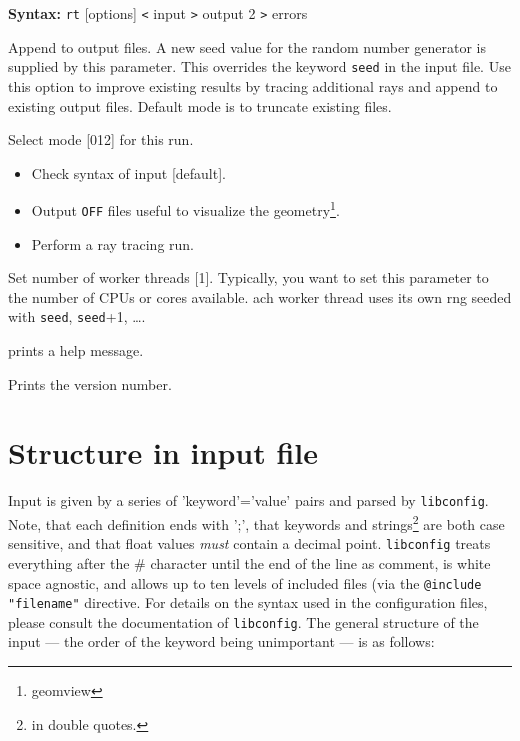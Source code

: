 \documentclass[10pt,a4paper,titlepage]{article}
\newcommand{\rt}{{\tt rt} }
\begin{document}
{\bf Syntax:} \rt [options] {\tt <} input {\tt >} output 2 {\tt >} errors
\vspace{1em}
\begin{list}{}
{\setlength{\leftmargin}{3.5cm}
\setlength{\labelwidth}{3.0cm}
\setlength{\labelsep}{0.25cm}
\setlength{\rightmargin}{0.5cm}}

\item[{\tt [--append|-a]}] Append to output files. A new seed value for the random number generator is supplied by this parameter. This overrides the keyword {\tt seed} in the input file. Use this option to improve existing results by tracing additional rays and append to existing output files. Default mode is to truncate existing files.

\item[{\tt [--mode|-m]}] Select mode [012] for this run.
\begin{itemize}
\item[\tt -m0]{Check syntax of input [default].}
\item[\tt -m1]{Output {\tt OFF} files useful to visualize the geometry\footnote{geomview}.}
\item[\tt -m2]{Perform a ray tracing run.}
\end{itemize}

\item[{\tt [--threads|-t]}] {Set number of worker threads [1]. Typically, you want to set this parameter to the number of CPUs or cores available. ach worker thread uses its own rng seeded with {\tt seed}, {\tt seed}+1}, \ldots{}.

\item[{\tt [--help|-h]}] prints a help message.

\item[{\tt [--Version|-V]}] Prints the version number.

\end{list}


\section{Structure in input file}
Input is given by a series of 'keyword'='value' pairs and parsed by {\tt libconfig}. Note, that each definition ends with ';', that keywords and strings\footnote{in double quotes.} are both case sensitive, and that float values \emph{must} contain a decimal point. {\tt libconfig} treats everything after the \# character until the end of the line as comment, is white space agnostic, and allows up to ten levels of included files (via the {\tt @include "filename"} directive. For details on the syntax used in the configuration files, please consult the documentation of {\tt libconfig}.
The general structure of the input --- the order of the keyword being unimportant --- is as follows:
\end{document}
